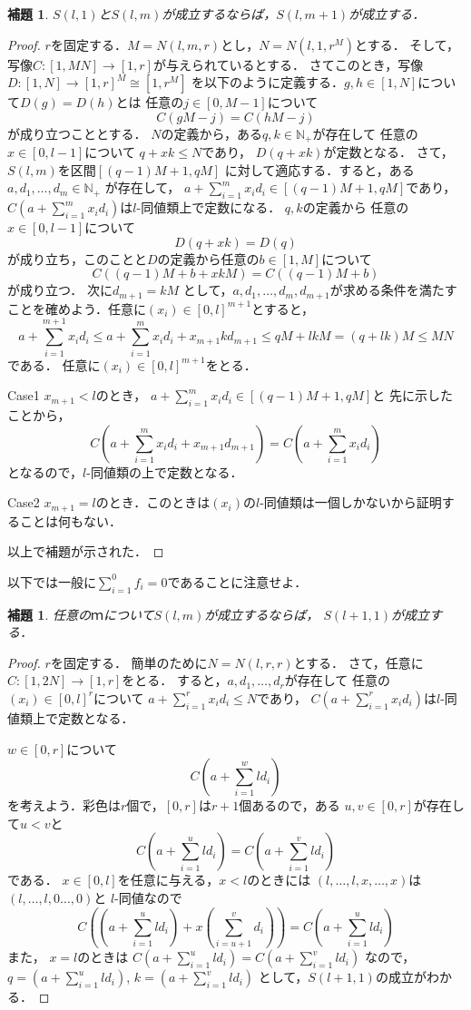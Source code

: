 \documentclass[leqno, 12pt]{jsarticle}
\newtheorem{lem}[thm]{補題}
\newcommand{\nn}{\mathbb{N}}
\begin{document}
\begin{lem}
$S(l, 1)$と$S(l, m)$が成立するならば，$S(l, m+1)$が成立する．
\end{lem}
\begin{proof}
$r$を固定する．$M=N(l, m, r)$とし，$N=N(l, 1, r^M)$とする．
そして，写像$C:[1, MN]\to [1, r]$が与えられているとする．
さてこのとき，写像$D: [1, N]\to [1, r]^M\cong [1, r^M]$
を以下のように定義する．$g,h\in [1, N]$について$D(g)=D(h)$とは
 任意の$j\in [0, M-1]$について
\[
C(gM-j)=C(hM-j)
\]
が成り立つこととする．
$N$の定義から，ある$q, k\in \nn_{+}$が存在して
任意の$x\in [0, l-1]$について
$q+xk\le N$であり，
$D(q+xk)$が定数となる．
さて，$S(l, m)$を区間$[(q-1)M+1, qM]$
に対して適応する．すると，ある$a, d_1, \dots, d_m\in \nn_+$
が存在して，
$a+\sum_{i=1}^mx_id_i\in [(q-1)M+1, qM]$であり，
$C(a+\sum_{i=1}^mx_id_i)$は$l$-同値類上で定数になる．
$q, k$の定義から
任意の
$x\in [0, l-1]$について
\[
D(q+xk)=D(q)
\]
が成り立ち，このことと$D$の定義から任意の$b\in [1, M]$について
\[
C((q-1)M+b+xkM)=C((q-1)M+b)
\]
が成り立つ．
次に$d_{m+1}=kM$
として，$a, d_1, \dots, d_m, d_{m+1}$が求める条件を満たすことを確めよう．任意に$(x_i)\in [0, l]^{m+1}$とすると，
\[
a+\sum_{i=1}^{m+1}x_id_i\le a+\sum_{i=1}^mx_id_i+x_{m+1}kd_{m+1}\le qM+lkM=(q+lk)M\le MN
\]
である．
任意に$(x_i)\in [0, l]^{m+1}$をとる．

Case1 $x_{m+1}<l$のとき，
$a+\sum_{i=1}^mx_id_i\in [(q-1)M+1, qM]$と
先に示したことから，
\[
C\left(a+\sum_{i=1}^mx_id_i+x_{m+1}d_{m+1}\right)=
C\left(a+\sum_{i=1}^mx_id_i\right)
\]
となるので，$l$-同値類の上で定数となる．

Case2 $x_{m+1}=l$のとき．このときは$(x_i)$の$l$-同値類は一個しかないから証明することは何もない．

以上で補題が示された．
\end{proof}








以下では一般に$\sum_{i=1}^0f_i=0$であることに注意せよ．


\begin{lem}
任意の$ｍ$について$S(l, m)$が成立するならば，
$S(l+1, 1)$が成立する．
\end{lem}
\begin{proof}
$r$を固定する．
簡単のために$N=N(l, r,r)$とする．
さて，任意に$C:[1, 2N]\to [1, r]$をとる．
すると，$a, d_1, \dots, d_r$が存在して
任意の$(x_i)\in [0, l]^r$について
$a+\sum_{i=1}^rx_id_i\le N$であり，
$C(a+\sum_{i=1}^rx_id_i)$は$l$-同値類上で定数となる．

$w\in [0,r]$について
\[
C\left(a+\sum_{i=1}^wld_i\right)
\]
を考えよう．彩色は$r$個で，$[0, r]$は$r+1$個あるので，ある
$u, v\in [0, r]$が存在して$u<v$と
\[
C\left(a+\sum_{i=1}^uld_i\right)=C\left(a+\sum_{i=1}^vld_i\right)
\]
である．
$x\in [0, l]$を任意に与える，$x<l$のときには
$(l, \dots, l, x,\dots, x)$は$(l, \dots, l, 0\dots, 0)$と
$l$-同値なので
\[
C\left(\left(a+\sum_{i=1}^uld_i\right)+x\left(\sum_{i=u+1}^vd_i\right)\right)=C\left(a+\sum_{i=1}^uld_i\right)
\]
また，
$x=l$のときは
$C(a+\sum_{i=1}^uld_i)=C(a+\sum_{i=1}^vld_i)$
なので，
$q=(a+\sum_{i=1}^uld_i)$, $k=(a+\sum_{i=1}^vld_i)$
として，$S(l+1, 1)$の成立がわかる．
\end{proof}
\end{document}
